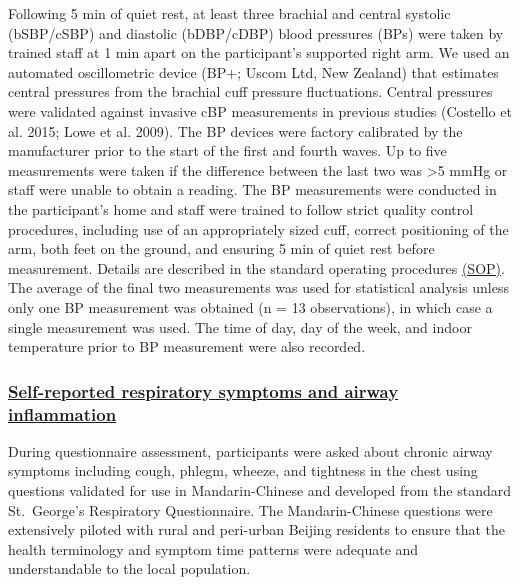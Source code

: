 \documentclass[
  letterpaper,
  DIV=11,
  numbers=noendperiod]{scrartcl}
\providecommand{\DIFadd}[1]{{\protect\color{blue}\underline{#1}}} %
\providecommand{\DIFaddbegin}{} %
\providecommand{\DIFaddend}{} %
\providecommand{\DIFdelbegin}{} %
\providecommand{\DIFdelend}{} %
\newcommand{\DIFscaledelfig}{0.5}
\newlength{\DIFdelgraphicswidth} %
\newlength{\DIFdelgraphicsheight} %
\newcommand{\DIFaddincludegraphics}[2][]{{\color{blue}\fbox{\DIFOincludegraphics[#1]{#2}}}} %
\newcommand{\DIFdelincludegraphics}[2][]{%
\sbox{\DIFdelgraphicsbox}{\DIFOincludegraphics[#1]{#2}}%
\settoboxwidth{\DIFdelgraphicswidth}{\DIFdelgraphicsbox} %
\settoboxtotalheight{\DIFdelgraphicsheight}{\DIFdelgraphicsbox} %
\scalebox{\DIFscaledelfig}{%
\parbox[b]{\DIFdelgraphicswidth}{\usebox{\DIFdelgraphicsbox}\\[-\baselineskip] \rule{\DIFdelgraphicswidth}{0em}}\llap{\resizebox{\DIFdelgraphicswidth}{\DIFdelgraphicsheight}{%
\setlength{\unitlength}{\DIFdelgraphicswidth}%
\begin{picture}(1,1)%
\thicklines\linethickness{2pt} %
{\color[rgb]{1,0,0}\put(0,0){\framebox(1,1){}}}%
{\color[rgb]{1,0,0}\put(0,0){\line( 1,1){1}}}%
{\color[rgb]{1,0,0}\put(0,1){\line(1,-1){1}}}%
\end{picture}%
}\hspace*{3pt}}} %
} %
\DeclareRobustCommand{\DIFaddbegin}{\DIFOaddbegin \let\includegraphics\DIFaddincludegraphics} %
\DeclareRobustCommand{\DIFaddend}{\DIFOaddend \let\includegraphics\DIFOincludegraphics} %
\DeclareRobustCommand{\DIFdelbegin}{\DIFOdelbegin \let\includegraphics\DIFdelincludegraphics} %
\DeclareRobustCommand{\DIFdelend}{\DIFOaddend \let\includegraphics\DIFOincludegraphics} %
\begin{document}
Following 5 min of quiet rest, at least three brachial and central
systolic (bSBP/cSBP) and diastolic (bDBP/cDBP) blood pressures (BPs)
were taken by trained staff at 1 min apart on the participant's
supported right arm. We used an automated oscillometric device (BP+;
Uscom Ltd, New Zealand) that estimates central pressures from the
brachial cuff pressure fluctuations. Central pressures were validated
against invasive cBP measurements in previous studies (Costello et al.
2015; Lowe et al. 2009). The BP devices were factory calibrated by the
manufacturer prior to the start of the first and fourth waves. Up to
five measurements were taken if the difference between the last two was
\textgreater5 mmHg or staff were unable to obtain a reading. The BP
measurements were conducted in the participant's home and staff were
trained to follow strict quality control procedures, including use of an
appropriately sized cuff, correct positioning of the arm, both feet on
the ground, and ensuring 5 min of quiet rest before measurement. Details
are described in the standard operating procedures
\href{https://osf.io/gmka5}{(SOP)}. The average of the final two
measurements was used for statistical analysis unless only one BP
measurement was obtained (n = 13 observations), in which case a single
measurement was used. The time of day, day of the week, and indoor
temperature prior to BP measurement were also recorded.

\DIFdelbegin %
\DIFdelend \DIFaddbegin \subsubsection{\DIFadd{Self-reported respiratory symptoms and airway
inflammation}}\label{self-reported-respiratory-symptoms-and-airway-inflammation}
\DIFaddend 

During questionnaire assessment, participants were asked about chronic
airway symptoms including cough, phlegm, wheeze, and tightness in the
chest using questions validated for use in Mandarin-Chinese and
developed from the standard St.~George's Respiratory Questionnaire. The
Mandarin-Chinese questions were extensively piloted with rural and
peri-urban Beijing residents to ensure that the health terminology and
symptom time patterns were adequate and understandable to the local
population.
\end{document}
